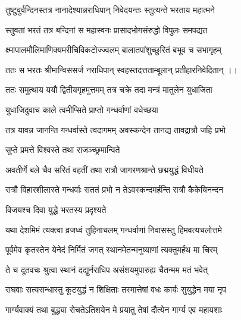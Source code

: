 \twolineshloka
{तुष्टुवुर्वन्दिनस्तत्र नानादेश्यान्नराधिपान्}
{निवेदयन्तः स्तुत्यन्ते भरताय महात्मने}%

\twolineshloka
{स्तुवतां भरतं तत्र बन्दिनां स महास्वनः}
{प्रासादभोगसंरुद्धो विपुलः समपद्यत}%

\twolineshloka
{क्ष्मापालमौलिमाणिक्यमरीचिविकटोज्ज्वलम्}
{बालातपांशुच्छुरितं बभूव च सभागृहम्}%

\twolineshloka
{ततः स भरतः श्रीमान्विससर्ज नराधिपान्}
{स्वहस्तदत्तताम्बूलान् प्रतीहारनिवेदितान् ।।}%

\twolineshloka
{ततः समुत्थाय ययौ द्वितीयगृहमुत्तमम्}
{तत्र चक्रे तदा मन्त्रं मातुलेन युधाजिता}%


{युधाजिदुवाच}
\onelineshloka
{काले त्वमीप्सिते प्राप्तो गन्धर्वाणां वधेच्छया}%

\twolineshloka
{तत्र यावन्न जानन्ति गन्धर्वास्ते त्वदागमम्}
{अवस्कन्देन तानद्य तावद्रात्रौ जहि प्रभो}%



\onelineshloka
{सुप्ते प्रमत्ते विश्वस्ते तथा राजञ्च्छ्रमान्विते}%

\twolineshloka
{अवतीर्णे बले चैव सरितं वहतीं तथा}
{रात्रौ जागरणश्रान्ते छद्मयुद्धं विधीयते}%

\twolineshloka
{रात्रौ विहारशीलास्ते गन्धर्वाः सततं प्रभो}
{न तेऽवस्कन्दमर्हन्ति रात्रौ कैकेयिनन्दन}%

\onelineshloka
{विजयश्च दिवा युद्धे भरतस्य प्रदृश्यते}



\twolineshloka
{यथा देशमिमं त्यक्त्वा व्रजध्वं तुहिनाचलम्}
{गन्धर्वाणां निवासस्तु हिमवत्यचलोत्तमे}%

\twolineshloka
{पूर्वमेव कृतस्तेन येनेदं निर्मितं जगत्}
{स्थानमेतन्मनुष्याणां त्यक्तुमर्हथ मा चिरम्}%

\twolineshloka
{ते च दूतवचः श्रुत्वा स्थानं दद्युर्नराधिप}
{असंशयमुपारुह्य चैतन्मम मतं भवेत्}%


\twolineshloka
{राघवाः सत्यसन्धास्तु कूटयुद्धं न शिक्षिताः}
{तस्मात्तेषां वधः कार्यः सुयुद्धेन मया नृप}%

\twolineshloka
{गार्ग्यवाक्यं तथा बुद्ध्या रोचतेऽतिशयेन मे}
{प्रयातु तेषां दौत्येन गार्ग्य एव महायशाः}%

